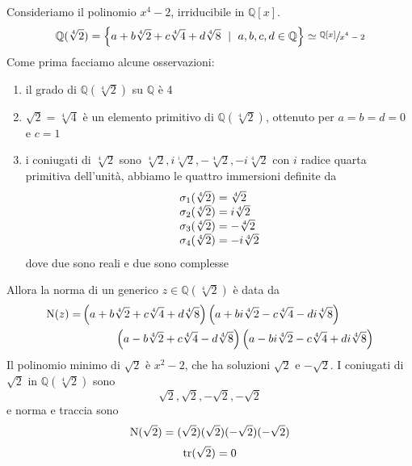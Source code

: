\begin{esempio}
		Consideriamo il polinomio $x^4-2$, irriducibile in $\mathbb{Q}[x]$.
		\begin{equation*}
		\mathbb{Q}(\sqrt[4]{2})=\left\{a+b\sqrt[4]{2}+c\sqrt[4]{4}+d\sqrt[4]{8} \ \mid \ a,b,c,d\in\mathbb{Q}\right\}\simeq\sfrac{\mathbb{Q}[x]}{x^4-2}
		\end{equation*}
		Come prima facciamo alcune osservazioni:
		\begin{enumerate}
			\item il grado di $\mathbb{Q}(\sqrt[4]{2})$ su $\mathbb{Q}$ è 4
			\item $\sqrt{2}=\sqrt[4]{4}$ è un elemento primitivo di $\mathbb{Q}(\sqrt[4]{2})$, ottenuto per $a=b=d=0$ e $c=1$
			\item i coniugati di $\sqrt[4]{2}$ sono $\sqrt[4]{2},i\sqrt[i]{2},-\sqrt[4]{2},-i\sqrt[4]{2}$ con $i$ radice quarta primitiva dell'unità, abbiamo le quattro immersioni definite da
			\begin{equation*}
				\arraycolsep=1.4pt
				\begin{array}{ll}
				\sigma_1(\sqrt[4]{2})&=\sqrt[4]{2}\\
				\sigma_2(\sqrt[4]{2})&=i\sqrt[4]{2}\\
				\sigma_3(\sqrt[4]{2})&=-\sqrt[4]{2}\\
				\sigma_4(\sqrt[4]{2})&=-i\sqrt[4]{2}\\
				\end{array}
			\end{equation*}
			dove due sono reali e due sono complesse
		\end{enumerate}
		Allora la norma di un generico $z\in\mathbb{Q}(\sqrt[4]{2})$ è data da 
		\begin{align*}
		\N(z)=&
		\left(a
		+
		b
		\sqrt[4]{2}
		+
		c
		\sqrt[4]{4}
		+
		d
		\sqrt[4]{8}
		\right)
		\left(
		a
		+
		bi
		\sqrt[4]{2}
		-
		c
		\sqrt[4]{4}-
		di
		\sqrt[4]{8}
		\right)\\
		&\ \ \ \ \ \ \ \ \ 
		\left(
		a
		-
		b
		\sqrt[4]{2}
		+
		c\sqrt[4]{4}
		-
		d
		\sqrt[4]{8}
		\right)
		\left(
		a
		-
		bi
		\sqrt[4]{2}
		-
		c
		\sqrt[4]{4}
		+
		di
		\sqrt[4]{8}
		\right)
		\end{align*}
		Il polinomio minimo di $\sqrt{2}$ è $x^2-2$, che ha soluzioni $\sqrt{2}$ e $-\sqrt{2}$. I coniugati di $\sqrt{2}$ in $\mathbb{Q}(\sqrt[4]{2})$ sono 
		\begin{equation*}
		\sqrt{2},\sqrt{2},-\sqrt{2},-\sqrt{2}
		\end{equation*}
		e norma e traccia sono 
		\begin{equation*}
		\operatorname{N}(\sqrt{2})=(\sqrt{2})(\sqrt{2})(-\sqrt{2})(-\sqrt{2})
		\end{equation*}
		\begin{equation*}
		\operatorname{tr}(\sqrt{2})=0
		\end{equation*}
\end{esempio}
